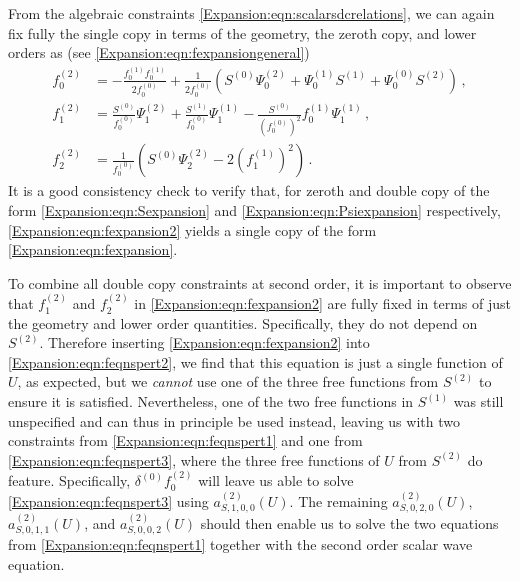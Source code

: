 From the algebraic constraints \eqref{Expansion:eqn:scalarsdcrelations}, we can again fix fully the single copy in terms of the geometry, the zeroth copy, and lower orders as (see \eqref{Expansion:eqn:fexpansiongeneral})
\begin{equation}\label{Expansion:eqn:fexpansion2}
\begin{aligned}
f_0^{(2)} &= -  \frac{f_0^{(1)} f_0^{(1)}}{2 f_0^{(0)}} + \frac{1}{ 2f_0^{(0)}}(S^{(0)}\Psi_0^{(2)}+\Psi_0^{(1)} S^{(1)}+\Psi_0^{(0)} S^{(2)})  \, , \\
f^{(2)}_1 &= \frac{S^{(0)}}{f_0^{(0)}} \Psi_1^{(2)} +  \frac{S^{(1)}}{f_0^{(0)}} \Psi_1^{(1)}  - \frac{S^{(0)}}{(f_0^{(0)})^2} f_0^{(1)} \Psi_1^{(1)}  \, , \\  
f_2^{(2)} &= \frac{1}{f_0^{(0)}}\left(S^{(0)}\Psi_2^{(2)}-2 (f_1^{(1)})^2\right) \, .
\end{aligned}
\end{equation}
It is a good consistency check to verify that, for zeroth and double copy of the form \eqref{Expansion:eqn:Sexpansion} and \eqref{Expansion:eqn:Psiexpansion} respectively, \eqref{Expansion:eqn:fexpansion2} yields a single copy of the form  \eqref{Expansion:eqn:fexpansion}. 

To combine all double copy constraints at second order, it is important to observe that $f^{(2)}_1$ and $f_2^{(2)}$ in \eqref{Expansion:eqn:fexpansion2} are fully fixed in terms of just the geometry and lower order quantities. Specifically, they do not depend on $S^{(2)}$. Therefore inserting \eqref{Expansion:eqn:fexpansion2} into \eqref{Expansion:eqn:feqnspert2}, we find that this equation is just a single function of $U$, as expected, but we \emph{cannot} use one of the three free functions from $S^{(2)}$ to ensure it is satisfied. Nevertheless, one of the two free functions in $S^{(1)}$ was still unspecified and can thus in principle be used instead, leaving us with two constraints from \eqref{Expansion:eqn:feqnspert1} and one from \eqref{Expansion:eqn:feqnspert3}, where the three free functions of $U$ from $S^{(2)}$ do feature. Specifically, $\delta^{(0)}f_0^{(2)}$ will leave us able to solve \eqref{Expansion:eqn:feqnspert3} using $a^{(2)}_{S,1, 0,0}(U)$.  The remaining $a^{(2)}_{S,0, 2,0}(U)$, $a^{(2)}_{S,0, 1,1}(U)$, and $a^{(2)}_{S,0, 0,2}(U)$ should then enable us to solve the two equations from \eqref{Expansion:eqn:feqnspert1} together with the second order scalar wave equation. 

